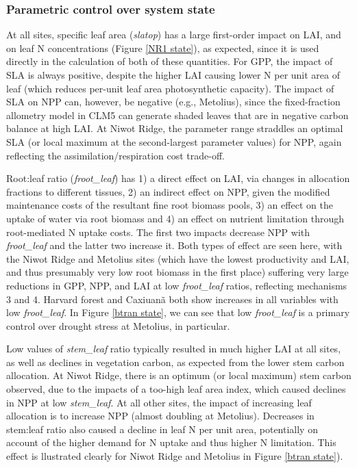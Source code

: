 \documentclass[draft,linenumbers]{agujournal}
\begin{document}
\subsubsection{Parametric control over system state}
At all sites, specific leaf area (\emph{slatop}) has a large first-order impact on LAI, and on leaf N concentrations (Figure \ref{NR1 state}), as expected, since it is used directly in the calculation of both of these quantities. For GPP, the impact of SLA is always positive, despite the higher LAI causing lower N per unit area of leaf (which reduces per-unit leaf area photosynthetic capacity). The impact of SLA on NPP can, however, be negative (e.g., Metolius), since the fixed-fraction allometry model in CLM5 can generate shaded leaves that are in negative carbon balance at high LAI. At Niwot Ridge, the parameter range straddles an optimal SLA (or local maximum at the second-largest parameter values) for NPP, again reflecting the assimilation/respiration cost trade-off.

Root:leaf ratio (\emph{froot\_leaf}) has 1) a direct effect on LAI, via changes in allocation fractions to different tissues, 2) an indirect effect on NPP, given the modified maintenance costs of the resultant fine root biomass pools, 3) an effect on the uptake of water via root biomass and 4) an effect on nutrient limitation through root-mediated N uptake costs.  The first two impacts decrease NPP with \emph{froot\_leaf} and the latter two increase it.  Both types of effect are seen here, with the Niwot Ridge and Metolius sites (which have the lowest productivity and LAI, and thus presumably very low root biomass in the first place) suffering very large reductions in GPP, NPP, and LAI at low \emph{froot\_leaf} ratios, reflecting mechanisms 3 and 4.  Harvard forest and Caxiuan\~a both show increases in all variables with low \emph{froot\_leaf}.  In Figure \ref{btran state}, we can see that low \emph{froot\_leaf} is a primary control over drought stress at Metolius, in particular. 

Low values of \emph{stem\_leaf} ratio typically resulted in much higher LAI at all sites, as well as declines in vegetation carbon, as expected from the lower stem carbon allocation. At Niwot Ridge, there is an optimum (or local maximum) stem carbon observed, due to the impacts of a too-high leaf area index, which caused declines in NPP at low \emph{stem\_leaf}. At all other sites, the impact of increasing leaf allocation is to increase NPP (almost doubling at Metolius). Decreases in stem:leaf ratio also caused a decline in leaf N per unit area, potentially on account of the higher demand for N uptake and thus higher N limitation. This effect is llustrated clearly for Niwot Ridge and Metolius in Figure \ref{btran state}). 
\end{document}
